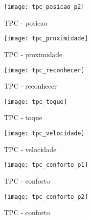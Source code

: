 \begin{figure}[ht!]
    \centering
    \begin{minipage}{\textwidth}
        \caption{TPC - posicao}
        \texttt{[image: tpc\_posicao\_p2]}
    \end{minipage}
\end{figure}

\begin{figure}[ht!]
    \centering
    \begin{minipage}{\textwidth}
        \caption{TPC - proximidade}
        \texttt{[image: tpc\_proximidade]}
    \end{minipage}
\end{figure}

\begin{figure}[ht!]
    \centering
    \begin{minipage}{\textwidth}
        \caption{TPC - reconhecer}
        \texttt{[image: tpc\_reconhecer]}
    \end{minipage}
\end{figure}

\begin{figure}[ht!]
    \centering
    \begin{minipage}{\textwidth}
        \caption{TPC - toque}
        \texttt{[image: tpc\_toque]}
    \end{minipage}
\end{figure}

\begin{figure}[ht!]
    \centering
    \begin{minipage}{\textwidth}
        \caption{TPC - velocidade}
        \texttt{[image: tpc\_velocidade]}
    \end{minipage}
\end{figure}

\begin{figure}[ht!]
    \centering
    \begin{minipage}{\textwidth}
        \caption{TPC - conforto}
        \texttt{[image: tpc\_conforto\_p1]}
    \end{minipage}
\end{figure}

\begin{figure}[ht!]
    \centering
    \begin{minipage}{\textwidth}
        \caption{TPC - conforto}
        \texttt{[image: tpc\_conforto\_p2]}
    \end{minipage}
\end{figure}

